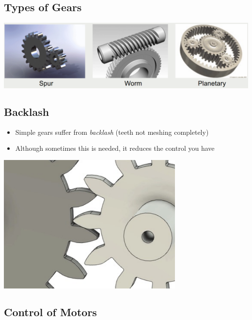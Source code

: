 \documentclass[10pt]{article}
\begin{document}
\subsection*{Types of Gears}
\begin{center} 
	\includegraphics*[width=\textwidth]{L2_14.png} 
\end{center}

\subsection*{Backlash}
\begin{itemize}
	\item Simple gears suffer from \textit{backlash} (teeth not meshing completely)
	\item Although sometimes this is needed, it reduces the control you have
\end{itemize}
\begin{center} 
	\includegraphics*[width=0.7\textwidth]{L2_15.png} 
\end{center}

\pagebreak
\subsection*{Control of Motors}
\end{document}
